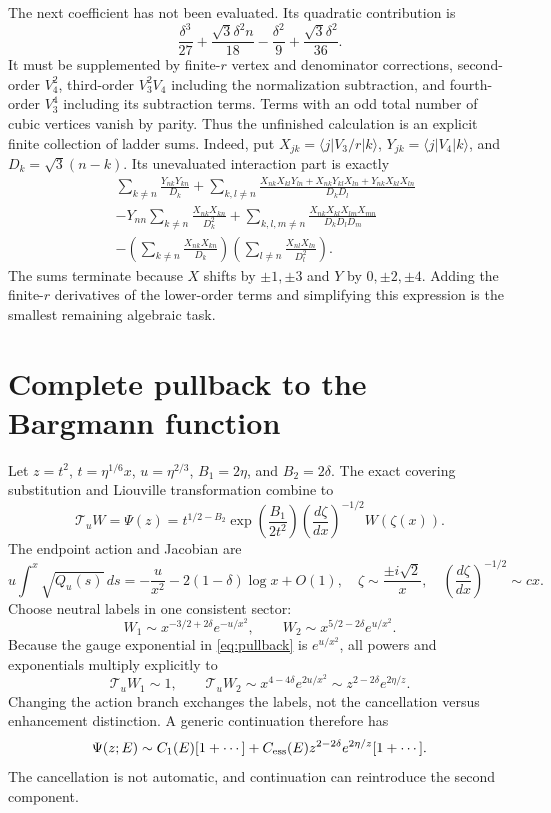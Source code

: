 \documentclass[11pt]{article}
\begin{document}
The next coefficient has not been evaluated.  Its quadratic contribution is
\[
\frac{\delta^3}{27}+\frac{\sqrt3\delta^2n}{18}
-\frac{\delta^2}{9}+\frac{\sqrt3\delta^2}{36}.
\]
It must be supplemented by finite-\(r\) vertex and denominator corrections,
second-order \(V_4^2\), third-order \(V_3^2V_4\) including the normalization
subtraction, and fourth-order \(V_3^4\) including its subtraction terms.
Terms with an odd total number of cubic vertices vanish by parity.  Thus the
unfinished calculation is an explicit finite collection of ladder sums.
Indeed, put \(X_{jk}=\langle j|V_3/r|k\rangle\),
\(Y_{jk}=\langle j|V_4|k\rangle\), and \(D_k=\sqrt3(n-k)\).  Its unevaluated
interaction part is exactly
\begin{align*}
&\sum_{k\ne n}\frac{Y_{nk}Y_{kn}}{D_k}
+\sum_{k,l\ne n}\frac{X_{nk}X_{kl}Y_{ln}
+X_{nk}Y_{kl}X_{ln}+Y_{nk}X_{kl}X_{ln}}{D_kD_l}\\
&-Y_{nn}\sum_{k\ne n}\frac{X_{nk}X_{kn}}{D_k^2}
+\sum_{k,l,m\ne n}\frac{X_{nk}X_{kl}X_{lm}X_{mn}}{D_kD_lD_m}\\
&-\left(\sum_{k\ne n}\frac{X_{nk}X_{kn}}{D_k}\right)
\left(\sum_{l\ne n}\frac{X_{nl}X_{ln}}{D_l^2}\right).
\end{align*}
The sums terminate because \(X\) shifts by \(\pm1,\pm3\) and \(Y\) by
\(0,\pm2,\pm4\).  Adding the finite-\(r\) derivatives of the lower-order
terms and simplifying this expression is the smallest remaining algebraic
task.

\section{Complete pullback to the Bargmann function}

Let \(z=t^2\), \(t=\eta^{1/6}x\), \(u=\eta^{2/3}\),
\(B_1=2\eta\), and \(B_2=2\delta\).  The exact covering substitution and
Liouville transformation combine to
\begin{equation}
\boxed{\mathcal T_uW=\Psi(z)=t^{1/2-B_2}
\exp\!\left(\frac{B_1}{2t^2}\right)
\left(\frac{d\zeta}{dx}\right)^{-1/2}W(\zeta(x)).}
\label{eq:pullback}
\end{equation}
The endpoint action and Jacobian are
\[
u\int^x\sqrt{Q_u(s)}\,ds=-\frac{u}{x^2}
-2(1-\delta)\log x+O(1),\quad
\zeta\sim\frac{\pm i\sqrt2}{x},\quad
\left(\frac{d\zeta}{dx}\right)^{-1/2}\sim c x.
\]
Choose neutral labels in one consistent sector:
\[
W_1\sim x^{-3/2+2\delta}e^{-u/x^2},\qquad
W_2\sim x^{5/2-2\delta}e^{u/x^2}.
\]
Because the gauge exponential in \eqref{eq:pullback} is \(e^{u/x^2}\),
all powers and exponentials multiply explicitly to
\[
\mathcal T_uW_1\sim1,\qquad
\mathcal T_uW_2\sim x^{4-4\delta}e^{2u/x^2}
\sim z^{2-2\delta}e^{2\eta/z}.
\]
Changing the action branch exchanges the labels, not the cancellation versus
enhancement distinction.  A generic continuation therefore has
\[
\Psi(z;E)\sim C_1(E)[1+\cdots]+C_{\rm ess}(E)
z^{2-2\delta}e^{2\eta/z}[1+\cdots].
\]
The cancellation is not automatic, and continuation can reintroduce the
second component.
\end{document}
